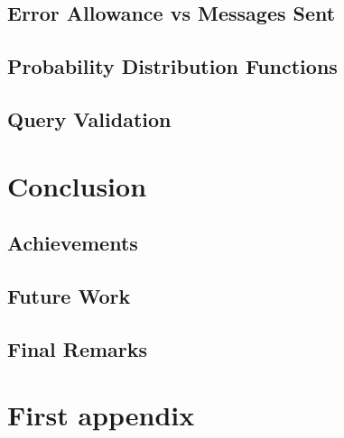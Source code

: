 \documentclass{mproj}
\begin{document}
\section{Error Allowance vs Messages Sent}

\section{Probability Distribution Functions}

\section{Query Validation}

\chapter{Conclusion}\label{conclusion}

\section{Achievements}

\section{Future Work}

\section{Final Remarks}

\appendix %

\chapter{First appendix}



\end{document}
